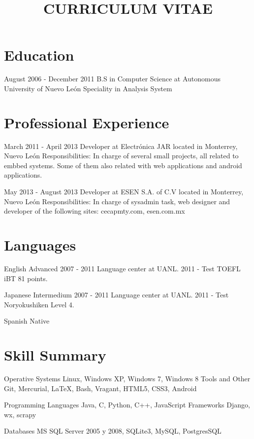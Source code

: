 \documentclass[10pt,a4paper]{moderncv}
\title{CURRICULUM VITAE{}}
\begin{document}
\maketitle

\section{Education}
  \cventry
    {August 2006 - December 2011}
    {B.S in Computer Science}
    {at Autonomous University of Nuevo León}
    {}
    {Speciality in Analysis System}
    {}

\section{Professional Experience}
  \cventry
  {March 2011 - April 2013}
  {Developer}
  {at Electrónica JAR}
  {located in Monterrey, Nuevo León}
  {}
  {Responsibilities: In charge of several small projects, all related to embbed systems. Some of them also related with web applications and android applications.}

  \cventry
    {May 2013 - August 2013}
    {Developer}
    {at ESEN S.A. of C.V}
    {located in Monterrey, Nuevo León}
    {}
    {Responsibilities: In charge of sysadmin task, web designer and developer of the following sites: cecapmty.com, esen.com.mx}

\section{Languages}
  \cvlanguage
    {English}
    {Advanced}
    {2007 - 2011 Language center at UANL. 2011 - Test TOEFL iBT 81 points.}

  \cvlanguage
    {Japanese}
    {Intermedium}
    {2007 - 2011 Language center at UANL. 2011 - Test Noryokushiken Level 4.}

  \cvlanguage
    {Spanish}
    {Native}
    {}

\section{Skill Summary}
  \cvcomputer
    {Operative Systems}
      {Linux, Windows XP, Windows 7, Windows 8}
    {Tools and Other}
      {Git, Mercurial, \LaTeX, Bash, Vragant, HTML5, CSS3, Android}

  \cvcomputer
    {Programming Languages}
      {Java, C, Python, C++, JavaScript}
    {Frameworks}
      {Django, wx, scrapy}

  \cvcomputer
    {Databases}
      {MS SQL Server 2005 y 2008, SQLite3, MySQL, PostgresSQL}
    {}
      {}
\end{document}
